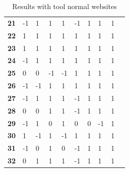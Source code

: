 \documentclass[twoside,openright,notitlepage]{uva-bachelor-thesis}
\begin{document}
\begin{table}[h!]
{\begin{tabular}{llllllllll}
\textbf{21} & -1 & 1  & 1  & 1  & -1 & 1  & 1  & 1 \\
\textbf{22} & 1  & 1  & 1  & 1  & 1  & 1  & 1  & 1 \\
\textbf{23} & 1  & 1  & 1  & 1  & 1  & 1  & 1  & 1 \\
\textbf{24} & -1 & 1  & 1  & 1  & 1  & 1  & 1  & 1 \\
\textbf{25} & 0  & 0  & -1 & -1 & 1  & 1  & 1  & 1 \\
\textbf{26} & -1 & -1 & 1  & 1  & 1  & 1  & 1  & 1 \\
\textbf{27} & -1 & 1  & 1  & 1  & -1 & 1  & 1  & 1 \\
\textbf{28} & 0  & 0  & 1  & 1  & -1 & 1  & 1  & 1 \\
\textbf{29} & -1 & 1  & 0  & 1  & 0  & 0  & -1 & 1 \\
\textbf{30} & 1  & -1 & 1  & -1 & 1  & 1  & 1  & 1 \\
\textbf{31} & -1 & 0  & 1  & 0  & -1 & 1  & 1  & 1 \\
\textbf{32} & 0  & 1  & 1  & 1  & -1 & 1  & 1  & 1
\end{tabular}
\caption{Results with tool normal websites}
}
\end{table}
\end{document}
